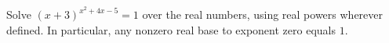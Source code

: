 Solve $(x+3)^{x^2+4x-5}=1$ over the real numbers, using real powers wherever defined. In particular, any nonzero real base to exponent zero equals $1$.
